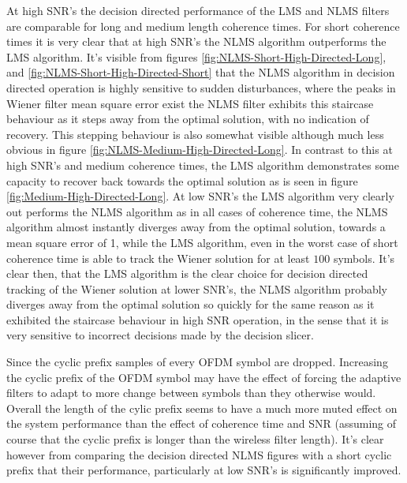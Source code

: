 At high SNR's the decision directed performance of the LMS and %
NLMS filters are comparable for long and medium length coherence %
times. For short coherence times it is very clear that at high %
SNR's the NLMS algorithm outperforms the LMS algorithm. It's visible from %
figures \ref{fig:NLMS-Short-High-Directed-Long}, and
\ref{fig:NLMS-Short-High-Directed-Short} that the NLMS algorithm %
in decision directed operation is highly sensitive to sudden disturbances, %
where the peaks in Wiener filter mean square error exist the %
NLMS filter exhibits this staircase behaviour as it steps away %
from the optimal solution, with no indication of recovery. This %
stepping behaviour is also somewhat visible although much less %
obvious in figure \ref{fig:NLMS-Medium-High-Directed-Long}. %
In contrast to this at high SNR's and medium coherence times, %
the LMS algorithm demonstrates some capacity to recover %
back towards the optimal solution as is seen in figure %
\ref{fig:Medium-High-Directed-Long}. At low SNR's the %
LMS algorithm very clearly out performs the NLMS algorithm %
as in all cases of coherence time, the NLMS algorithm almost %
instantly diverges away from the optimal solution, towards %
a mean square error of 1, while the LMS algorithm, even in the %
worst case of short coherence time is able to track the %
Wiener solution for at least $100$ symbols. It's clear then, that %
the LMS algorithm is the clear choice for decision directed tracking %
of the Wiener solution at lower SNR's, the NLMS algorithm probably %
diverges away from the optimal solution so quickly for the same %
reason as it exhibited the staircase behaviour in high SNR operation, in %
the sense that it is very sensitive to incorrect decisions made by the %
decision slicer. 

Since the cyclic prefix samples of every OFDM symbol are dropped. %
Increasing the cyclic prefix of the OFDM symbol may have the %
effect of forcing the adaptive filters to adapt to more change %
between symbols than they otherwise would. Overall the length %
of the cylic prefix seems to have a much more %
muted effect on the system performance than the effect of %
coherence time and SNR (assuming of course that the cyclic %
prefix is longer than the wireless filter length). It's clear however %
from comparing the decision directed NLMS figures with a short %
cyclic prefix that their performance, particularly at low SNR's is %
significantly improved.

